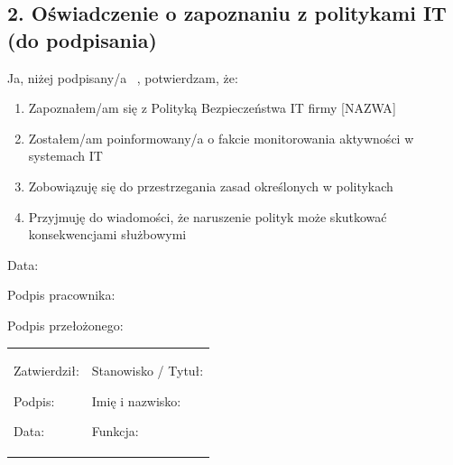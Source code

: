 \documentclass[12pt,a4paper]{article}
\providecommand{\tightlist}{\setlength{\itemsep}{0pt}\setlength{\parskip}{0pt}}
\begin{document}
\subsection{2. Oświadczenie o zapoznaniu z politykami IT (do
podpisania)}\label{oux15bwiadczenie-o-zapoznaniu-z-politykami-it-do-podpisania}

Ja, niżej podpisany/a {~}, potwierdzam, że:

\begin{enumerate}
\tightlist
\item
  Zapoznałem/am się z Polityką Bezpieczeństwa IT firmy {[}NAZWA{]}
\item
  Zostałem/am poinformowany/a o fakcie monitorowania aktywności w
  systemach IT
\item
  Zobowiązuję się do przestrzegania zasad określonych w politykach
\item
  Przyjmuję do wiadomości, że naruszenie polityk może skutkować
  konsekwencjami służbowymi
\end{enumerate}

Data: \underline{\hspace{3cm}}

Podpis pracownika: \underline{\hspace{3cm}}

Podpis przełożonego: \underline{\hspace{3cm}}

\begin{longtable}[]{@{}
  >{\raggedright\arraybackslash}p{}
  >{\raggedright\arraybackslash}p{}@{}}
\toprule\noalign{}
\endhead
\bottomrule\noalign{}
\endlastfoot
\begin{minipage}[t]{\linewidth}\raggedright
Zatwierdził:

Podpis: \underline{\hspace{3cm}}

Data: \underline{\hspace{4cm}}
\end{minipage} & \begin{minipage}[t]{\linewidth}\raggedright
Stanowisko / Tytuł:

Imię i nazwisko: \underline{\hspace{3cm}}

Funkcja: \underline{\hspace{3cm}}
\end{minipage} \\
\end{longtable}
\end{document}
